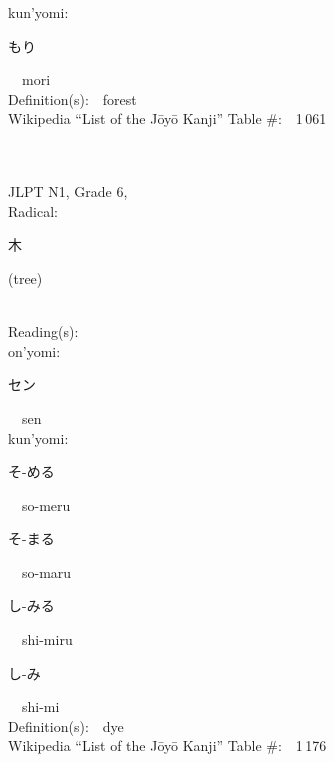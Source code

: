 \begin{multicols}{2}
{\hspace*{1em}}kun'yomi:\ \ \\
{\hspace*{2em}}{\begin{CJK}{UTF8}{min} もり \end{CJK}}\ \ mori\ \ \\
Definition(s):\ \ forest \\
Wikipedia ``List of the J\=oy\=o Kanji'' Table \#:\ \ 1\,061 \\
\ \ \\
{\fontsize{34pt}{40pt}  }\ \ \\  %
{JLPT N1, Grade 6, \\Radical:\ \ {\begin{CJK}{UTF8}{min} 木 \end{CJK}} (tree) } \\
Reading(s):\ \ \\
{\hspace*{1em}}on'yomi:\ \ \\
{\hspace*{2em}}{\begin{CJK}{UTF8}{min} セン \end{CJK}}\ \ sen\ \ \\
{\hspace*{1em}}kun'yomi:\ \ \\
{\hspace*{2em}}{\begin{CJK}{UTF8}{min} そ-める \end{CJK}}\ \ so-meru\ \ \\
{\hspace*{2em}}{\begin{CJK}{UTF8}{min} そ-まる \end{CJK}}\ \ so-maru\ \ \\
{\hspace*{2em}}{\begin{CJK}{UTF8}{min} し-みる \end{CJK}}\ \ shi-miru\ \ \\
{\hspace*{2em}}{\begin{CJK}{UTF8}{min} し-み \end{CJK}}\ \ shi-mi\ \ \\
Definition(s):\ \ dye \\
Wikipedia ``List of the J\=oy\=o Kanji'' Table \#:\ \ 1\,176 \\

\end{multicols}
